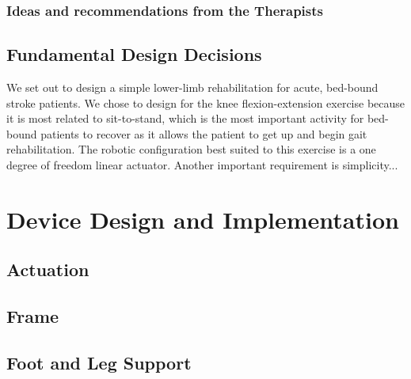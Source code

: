 \documentclass[12pt]{report}
\begin{document}
	 \subsection{Ideas and recommendations from the Therapists}
	
	\section{Fundamental Design Decisions}
%
We set out to design a simple lower-limb rehabilitation for acute, bed-bound stroke patients. We chose to design for the knee flexion-extension exercise because it is most related to sit-to-stand, which is the most important activity for bed-bound patients to recover as it allows the patient to get up and begin gait rehabilitation. The robotic configuration best suited to this exercise is a one degree of freedom linear actuator. 
	Another important requirement is simplicity...







\chapter{Device Design and Implementation}
	\section{Actuation}
%

	\section{Frame}
%
	\section{Foot and Leg Support}
%
\end{document}
